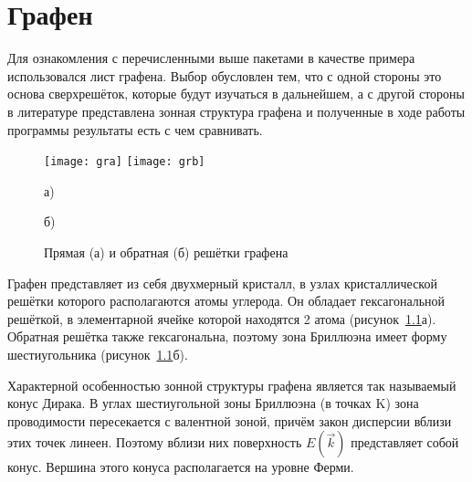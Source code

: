 \chapter{Графен}
Для ознакомления с перечисленными выше пакетами в качестве примера использовался лист графена. Выбор обусловлен тем, что с одной стороны это основа сверхрешёток, которые будут изучаться в дальнейшем, а с другой стороны в литературе представлена зонная структура графена и полученные в ходе работы программы результаты есть с чем сравнивать.

\begin{figure}[h]
    \center
    \texttt{[image: gra]}\hfill
    \texttt{[image: grb]}
    \parbox[t]{.4\textwidth}{\center а)}\hfill
    \parbox[t]{.4\textwidth}{\center б)}
    \caption{Прямая (а) и обратная (б) решётки графена}
    \label{graphene}
\end{figure}

Графен представляет из себя двухмерный кристалл, в узлах кристаллической решётки которого располагаются атомы углерода. Он обладает гексагональной решёткой, в элементарной ячейке которой находятся 2 атома (рисунок~\ref{graphene}а). Обратная решётка также гексагональна, поэтому зона Бриллюэна имеет форму шестиугольника (рисунок~\ref{graphene}б).

Характерной особенностью зонной структуры графена является так называемый конус Дирака. В углах шестиугольной зоны Бриллюэна (в точках K) зона проводимости пересекается с валентной зоной, причём закон дисперсии вблизи этих точек линеен. Поэтому вблизи них поверхность \(E(\vec{k})\) представляет собой конус. Вершина этого конуса располагается на уровне Ферми.